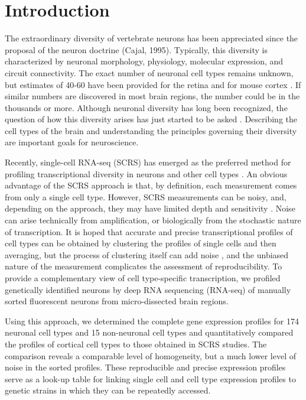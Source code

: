 \section*{Introduction}

The extraordinary diversity of vertebrate neurons has been appreciated since the proposal of the neuron doctrine (Cajal, 1995). Typically, this diversity is characterized by neuronal morphology, physiology, molecular expression, and circuit connectivity. The exact number of neuronal cell types remains unknown, but estimates of 40-60 have been provided for the retina \cite{Macosko_2015,Masland_2004} and for mouse cortex \cite{Tasic_2016, Zeisel_2015}. If similar numbers are discovered in most brain regions, the number could be in the thousands or more. Although neuronal diversity has long been recognized, the question of how this diversity arises has just started to be asked \cite{Arendt_2008, Muotri_2006}. Describing the cell types of the brain and understanding the principles governing their diversity are important goals for neuroscience.

Recently, single-cell RNA-seq (SCRS) has emerged as the preferred method for profiling transcriptional diversity in neurons and other cell types \cite{Shapiro_2013}. An obvious advantage of the SCRS approach is that, by definition, each measurement comes from only a single cell type. However, SCRS measurements can be noisy, and, depending on the approach, they may have limited depth and sensitivity \cite{Parekh_2016,  Svensson_2017}. Noise can arise technically from amplification, or biologically from the stochastic nature of transcription. It is hoped that accurate and precise transcriptional profiles of cell types can be obtained by clustering the profiles of single cells and then averaging, but the process of clustering itself can add noise \cite{Ntranos_2016}, and the unbiased nature of the measurement complicates the assessment of reproducibility. To provide a complementary view of cell type-specific transcription, we profiled genetically identified neurons \cite{Gong_2003, Shima_2016} by deep RNA sequencing (RNA-seq) of manually sorted fluorescent neurons from micro-dissected brain regions.  

Using this approach, we determined the complete gene expression profiles for 174 neuronal cell types and 15 non-neuronal cell types and quantitatively compared the profiles of cortical cell types to those obtained in SCRS studies. The comparison reveals a comparable level of homogeneity, but a much lower level of noise in the sorted profiles. These reproducible and precise expression profiles serve as a look-up table for linking single cell and cell type expression profiles to genetic strains in which they can be repeatedly accessed. 

